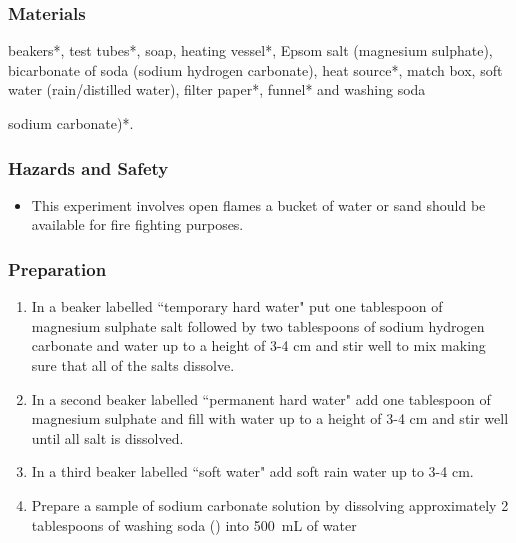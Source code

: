 \subsubsection*{Materials}
beakers*, test tubes*, soap, heating vessel*, Epsom salt (magnesium sulphate), bicarbonate of soda (sodium hydrogen carbonate), heat source*, match box, soft water (rain/distilled water), filter paper*, funnel* and washing soda {sodium carbonate)*.

\subsubsection*{Hazards and Safety}
\begin{itemize}
\item{This experiment involves open flames a bucket of water or sand should be available for fire fighting purposes.}
\end{itemize}

\subsubsection*{Preparation}
\begin{enumerate}
\item{In a beaker labelled ``temporary hard water" put one tablespoon of magnesium sulphate salt followed by two tablespoons  of sodium hydrogen carbonate and water up to a height of 3-4 cm and stir well to mix making sure that all of the salts dissolve.}
\item{In a second beaker labelled ``permanent hard water" add one tablespoon of magnesium sulphate and fill with water up to a height of 3-4 cm and stir well until all salt is dissolved.}
\item{In a third beaker labelled ``soft water"  add soft rain water up to 3-4 cm.}
\item{Prepare a sample of sodium carbonate solution by dissolving approximately 2 tablespoons of washing soda () into 500~mL of water}
\end{enumerate}

}

